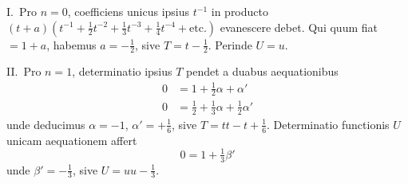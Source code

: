 \documentclass[12pt,a4paper]{article}
\begin{document}
I.\ Pro $n=0$, coefficiens unicus ipsius $t^{-1}$ in producto $(t+a)(t^{-1}+\frac{1}{2}t^{-2}+\frac{1}{3}t^{-3}+\frac{1}{4}t^{-4}+\text{etc.})$ evanescere debet. Qui quum fiat $=1+a$, habemus $a=-\frac{1}{2}$, sive $T=t-\frac{1}{2}$. Perinde $U=u$.

II.\ Pro $n=1$, determinatio ipsius $T$ pendet a duabus aequationibus
\begin{align*}
0 &= 1 + \tfrac{1}{2}\alpha + \alpha'\\
0 &= \tfrac{1}{2} + \tfrac{1}{3}\alpha + \tfrac{1}{2}\alpha'
\end{align*}
unde deducimus $\alpha=-1$, $\alpha'=+\frac{1}{6}$, sive $T=tt-t+\frac{1}{6}$. Determinatio functionis $U$ unicam aequationem affert
\[
0 = 1 + \tfrac{1}{3}\beta'
\]
unde $\beta'=-\frac{1}{3}$, sive $U=uu-\frac{1}{3}$.
\end{document}
